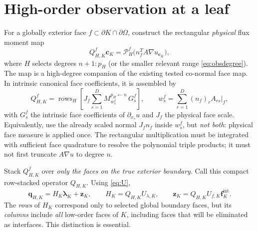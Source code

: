 \documentclass[11pt,letterpaper]{article}
\newcommand{\PP}{\mathcal P}
\newcommand{\lam}{\boldsymbol\lambda}
\newcommand{\fint}{\mathbf f^{\mathrm{int}}}
\newcommand{\zz}{\mathbf z}
\newcommand{\cc}{\mathbf c}
\begin{document}
\section{High-order observation at a leaf}
For a globally exterior face \(f\subset\partial K\cap\partial\Omega\), construct the rectangular \emph{physical} flux moment map
\begin{equation}\label{eq:QH}
 Q_{H,K}^{f}\cc_K
 =\PP_H^f\bigl(n_f^TA\nabla u_{\cc_K}\bigr),
\end{equation}
where \(H\) selects degrees \(n+1{:}p_H\) (or the smaller relevant range \eqref{eq:obsdegree}). The map is a high-degree companion of the existing tested co-normal face map. In intrinsic canonical face coefficients, it is assembled by
\begin{equation}\label{eq:QHbuild}
 Q_{H,K}^{f}=
 \operatorname{rows}_{H}\!\left[
 J_f\sum_{s=1}^{D}
 M_{w_s^f}^{p_H\leftarrow n}\,G_s^f\right],\qquad
 w_s^f=\sum_{r=1}^{D}(n_f)_r A_{rs}|_f,
\end{equation}
with \(G_s^f\) the intrinsic face coefficients of \(\partial_{x_s}u\) and \(J_f\) the physical face scale. Equivalently, use the already scaled normal \(J_fn_f\) inside \(w_s^f\), but \emph{not both}: physical face measure is applied once. The rectangular multiplication must be integrated with sufficient face quadrature to resolve the polynomial triple products; it must not first truncate \(A\nabla u\) to degree \(n\).

Stack \(Q_{H,K}^{f}\) over \emph{only the faces on the true exterior boundary}. Call this compact row-stacked operator \(Q_{H,K}\). Using \eqref{eq:U},
\begin{equation}\label{eq:leafH}
 \boxed{\quad
 \mathbf q_{H,K}=H_K\lam_K+\zz_K,\qquad
 H_K=Q_{H,K}U_{\lambda,K},\qquad
 \zz_K=Q_{H,K}U_{f,K}\fint_K.\quad}
\end{equation}
The \emph{rows} of \(H_K\) correspond only to selected global boundary faces, but its \emph{columns} include \emph{all} low-order faces of \(K\), including faces that will be eliminated as interfaces. This distinction is essential.
\end{document}
